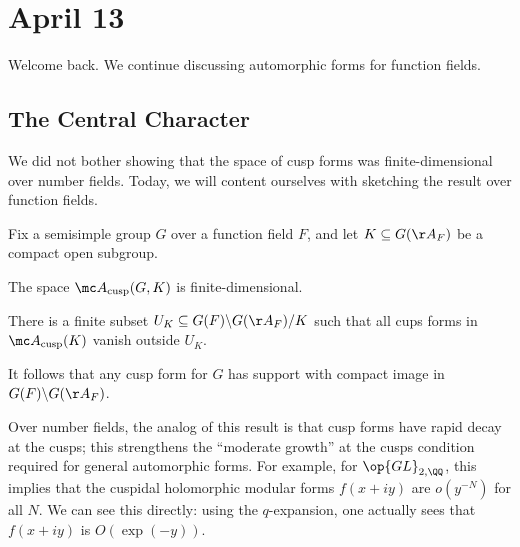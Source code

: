 \documentclass[../notes.tex]{subfiles}
\begin{document}
\section{April 13}
Welcome back. We continue discussing automorphic forms for function fields.

\subsection{The Central Character}
We did not bother showing that the space of cusp forms was finite-dimensional over number fields. Today, we will content ourselves with sketching the result over function fields.
\begin{theorem} \label{thm:cusp-compact-support}
	Fix a semisimple group $G$ over a function field $F$, and let $K\subseteq G(\AA_F)$ be a compact open subgroup.
	\begin{listalph}
		\item The space $\mc A_{\mathrm{cusp}}(G,K)$ is finite-dimensional.
		\item There is a finite subset $U_K\subseteq G(F)\backslash G(\AA_F)/K$ such that all cups forms in $\mc A_{\mathrm{cusp}}(K)$ vanish outside $U_K$.
	\end{listalph}
\end{theorem}
\begin{remark}
	It follows that any cusp form for $G$ has support with compact image in $G(F)\backslash G(\AA_F)$.
\end{remark}
\begin{remark}
	Over number fields, the analog of this result is that cusp forms have rapid decay at the cusps; this strengthens the ``moderate growth'' at the cusps condition required for general automorphic forms. For example, for $\op{GL}_{2,\QQ}$, this implies that the cuspidal holomorphic modular forms $f(x+iy)$ are $o\left(y^{-N}\right)$ for all $N$. We can see this directly: using the $q$-expansion, one actually sees that $f(x+iy)$ is $O(\exp(-y))$.
\end{remark}
\end{document}
